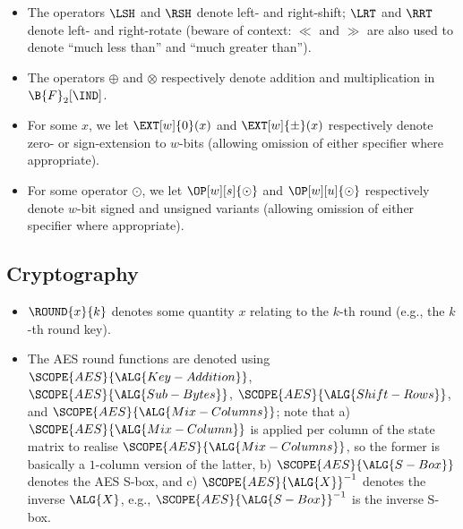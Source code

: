 \begin{itemize}

\item The operators $\LSH$ and $\RSH$ denote left- and right-shift; $\LRT$ and
      $\RRT$ denote left- and right-rotate (beware of context: $\ll$ and $\gg$
      are also used to denote ``much less than'' and ``much greater than'').
\item The operators 
      $\oplus$
      and
      $\otimes$
      respectively denote addition and multiplication in $\B{F}_2[\IND]$.
\item For some $x$, 
      we let
      $\EXT[w]{0  }( x )$
      and
      $\EXT[w]{\pm}( x )$
      respectively denote
      zero- or sign-extension to $w$-bits
      (allowing omission of either specifier where appropriate).
\item For some operator $\odot$, 
      we let
      $\OP[w][s]{\odot}$
      and 
      $\OP[w][u]{\odot}$
      respectively denote 
      $w$-bit signed and unsigned variants
      (allowing omission of either specifier where appropriate).

\end{itemize}


\subsection{Cryptography}

\begin{itemize}

\item $\ROUND{x}{k}$ denotes some quantity $x$ relating to the $k$-th 
      round (e.g., the $k$-th round key).
\item The AES round functions are denoted using
      $\SCOPE{AES}{\ALG{Key-Addition}}$,
      $\SCOPE{AES}{\ALG{Sub-Bytes}}$,
      $\SCOPE{AES}{\ALG{Shift-Rows}}$,
      and
      $\SCOPE{AES}{\ALG{Mix-Columns}}$;
      note that 
      a) $\SCOPE{AES}{\ALG{Mix-Column}}$ is applied per column of the
         state matrix to realise $\SCOPE{AES}{\ALG{Mix-Columns}}$, so
         the former is basically a $1$-column version of the latter,
      b) $\SCOPE{AES}{\ALG{S-Box}}$ denotes the AES S-box,
         and
      c) $\SCOPE{AES}{\ALG{X}}^{-1}$ denotes the inverse $\ALG{X}$,
         e.g., $\SCOPE{AES}{\ALG{S-Box}}^{-1}$ is the inverse S-box.

\end{itemize}


